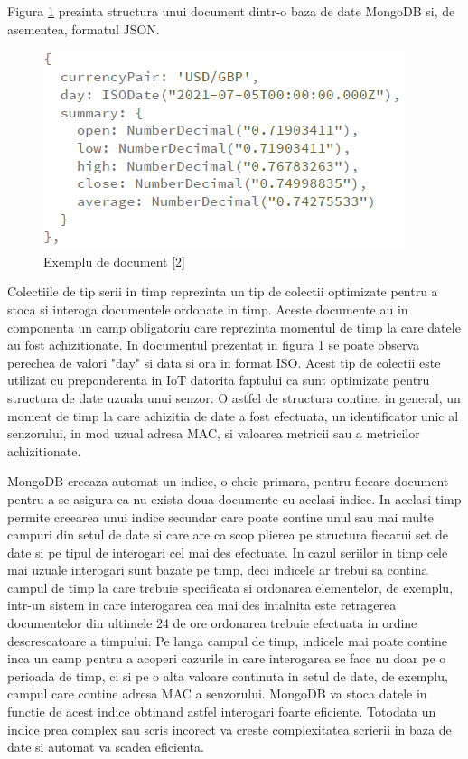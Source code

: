 Figura \ref{fig:MongoDBDocument} prezinta structura unui document dintr-o baza de date MongoDB si, de asementea, formatul JSON.
\begin{figure}[H]
    \centering
    \includegraphics[scale=0.8]{figs/mongoDBDocument.png}
    \caption{Exemplu de document [2]}
    \label{fig:MongoDBDocument}
\end{figure}

Colectiile de tip serii in timp reprezinta un tip de colectii optimizate pentru a stoca si interoga documentele ordonate in timp. Aceste documente au in 
componenta un camp obligatoriu care reprezinta momentul de timp la care datele au fost achizitionate. In documentul prezentat in figura \ref{fig:MongoDBDocument} 
se poate observa perechea de valori "day" si data si ora in format ISO. Acest tip de colectii este utilizat cu preponderenta in IoT datorita faptului ca sunt 
optimizate pentru structura de date uzuala unui senzor. O astfel de structura contine, in general, un moment de timp la care achizitia de date a fost efectuata, 
un identificator unic al senzorului, in mod uzual adresa MAC, si valoarea metricii sau a metricilor achizitionate.

MongoDB creeaza automat un indice, o cheie primara, pentru fiecare document pentru a se asigura ca nu exista doua documente cu acelasi indice. In acelasi timp 
permite creearea unui indice secundar care poate contine unul sau mai multe campuri din setul de date si care are ca scop plierea pe structura fiecarui set de date 
si pe tipul de interogari cel mai des efectuate. In cazul seriilor in timp cele mai uzuale interogari sunt bazate pe timp, deci indicele ar trebui sa contina campul 
de timp la care trebuie specificata si ordonarea elementelor, de exemplu, intr-un sistem in care interogarea cea mai des intalnita este retragerea documentelor 
din ultimele 24 de ore ordonarea trebuie efectuata in ordine descrescatoare a timpului. Pe langa campul de timp, indicele mai poate contine inca un camp pentru 
a acoperi cazurile in care interogarea se face nu doar pe o perioada de timp, ci si pe o alta valoare continuta in setul de date, de exemplu, campul care contine 
adresa MAC a senzorului. MongoDB va stoca datele in functie de acest indice obtinand astfel interogari foarte eficiente. Totodata un indice prea complex sau 
scris incorect va creste complexitatea scrierii in baza de date si automat va scadea eficienta. 



